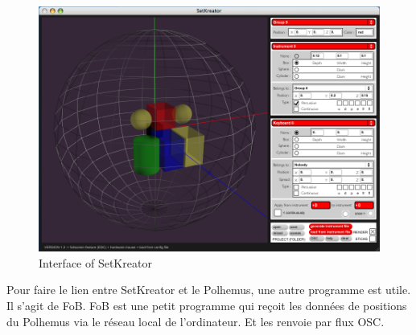 \begin{figure}[h!]
\centering\includegraphics[scale=0.3]{image/setkreator.png}
\caption{Interface of SetKreator}
\label{fig:setkreator}
\end{figure}


Pour faire le lien entre SetKreator et le Polhemus, une autre programme est utile. Il s'agit de FoB. FoB est une petit programme qui reçoit les données de positions du Polhemus via le réseau local de l'ordinateur. Et les renvoie par flux OSC.


